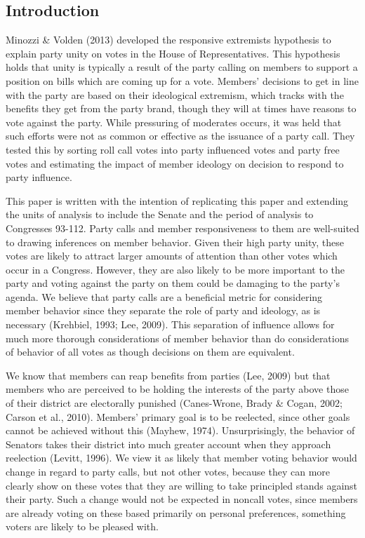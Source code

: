 \documentclass[12pt]{article}
\begin{document}
\subsection{Introduction}

Minozzi \& Volden (2013) developed the responsive extremists hypothesis to explain party unity on votes in the House of Representatives. This hypothesis holds that unity is typically a result of the party calling on members to support a position on bills which are coming up for a vote. Members' decisions to get in line with the party are based on their ideological extremism, which tracks with the benefits they get from the party brand, though they will at times have reasons to vote against the party. While pressuring of moderates occurs, it was held that such efforts were not as common or effective as the issuance of a party call. They tested this by sorting roll call votes into party influenced votes and party free votes and estimating the impact of member ideology on decision to respond to party influence.

This paper is written with the intention of replicating this paper and extending the units of analysis to include the Senate and the period of analysis to Congresses 93-112. Party calls and member responsiveness to them are well-suited to drawing inferences on member behavior. Given their high party unity, these votes are likely to attract larger amounts of attention than other votes which occur in a Congress. However, they are also likely to be more important to the party and voting against the party on them could be damaging to the party's agenda. We believe that party calls are a beneficial metric for considering member behavior since they separate the role of party and ideology, as is necessary (Krehbiel, 1993; Lee, 2009). This separation of influence allows for much more thorough considerations of member behavior than do considerations of behavior of all votes as though decisions on them are equivalent.

We know that members can reap benefits from parties (Lee, 2009) but that members who are perceived to be holding the interests of the party above those of their district are electorally punished (Canes-Wrone, Brady \& Cogan, 2002; Carson et al., 2010). Members' primary goal is to be reelected, since other goals cannot be achieved without this (Mayhew, 1974). Unsurprisingly, the behavior of Senators takes their district into much greater account when they approach reelection (Levitt, 1996). We view it as likely that member voting behavior would change in regard to party calls, but not other votes, because they can more clearly show on these votes that they are willing to take principled stands against their party. Such a change would not be expected in noncall votes, since members are already voting on these based primarily on personal preferences, something voters are likely to be pleased with.
\end{document}
